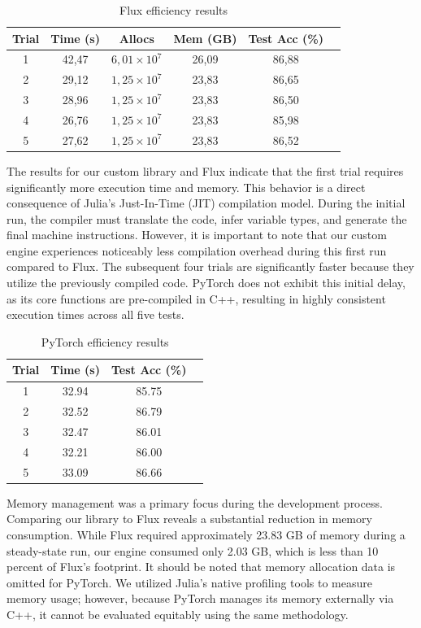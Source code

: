 \documentclass[conference]{IEEEtran}
\begin{document}
\begin{table}[htbp]
\centering
\caption{Flux efficiency results}
\label{tab:flux_efficiency}
\begin{tabular}{|c|c|c|c|c|c|}
\hline
\textbf{Trial} & \textbf{Time (s)} & \textbf{Allocs} & \textbf{Mem (GB)} & \textbf{Test Acc (\%)} \\ \hline
1 & 42,47 & $6,01 \times 10^7$ & 26,09 & 86,88 \\ \hline
2 & 29,12 & $1,25 \times 10^7$ & 23,83 & 86,65 \\ \hline
3 & 28,96 & $1,25 \times 10^7$ & 23,83 & 86,50 \\ \hline
4 & 26,76 & $1,25 \times 10^7$ & 23,83 & 85,98 \\ \hline
5 & 27,62 & $1,25 \times 10^7$ & 23,83 & 86,52 \\ \hline
\end{tabular}
\end{table}

The results for our custom library and Flux indicate that the first trial requires significantly more execution time and memory. This behavior is a direct consequence of Julia's Just-In-Time (JIT) compilation model. During the initial run, the compiler must translate the code, infer variable types, and generate the final machine instructions. However, it is important to note that our custom engine experiences noticeably less compilation overhead during this first run compared to Flux. The subsequent four trials are significantly faster because they utilize the previously compiled code. PyTorch does not exhibit this initial delay, as its core functions are pre-compiled in C++, resulting in highly consistent execution times across all five tests.

\begin{table}[htbp]
\centering
\caption{PyTorch efficiency results}
\label{tab:pytorch_efficiency}
\begin{tabular}{|c|c|c|c|}
\hline
\textbf{Trial} & \textbf{Time (s)} & \textbf{Test Acc (\%)} \\ \hline
1 & 32.94 & 85.75 \\ \hline
2 & 32.52 & 86.79 \\ \hline
3 & 32.47 & 86.01 \\ \hline
4 & 32.21 & 86.00 \\ \hline
5 & 33.09 & 86.66 \\ \hline
\end{tabular}
\end{table}

Memory management was a primary focus during the development process. Comparing our library to Flux reveals a substantial reduction in memory consumption. While Flux required approximately 23.83 GB of memory during a steady-state run, our engine consumed only 2.03 GB, which is less than 10 percent of Flux's footprint. It should be noted that memory allocation data is omitted for PyTorch. We utilized Julia's native profiling tools to measure memory usage; however, because PyTorch manages its memory externally via C++, it cannot be evaluated equitably using the same methodology.
\end{document}
